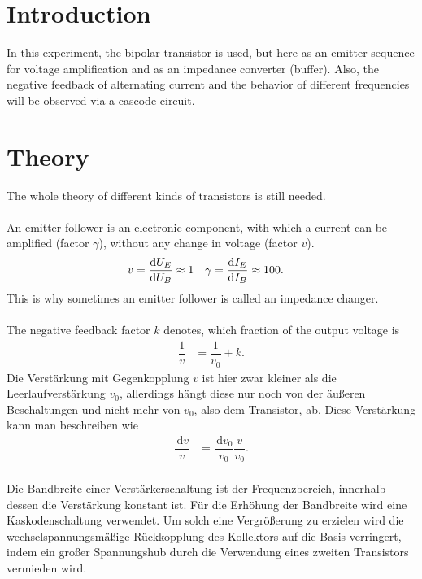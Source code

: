 \documentclass[a4paper,10pt]{article}
\newcommand{\td}{\,\text{d}}
\numberwithin{equation}{section}
\begin{document}
\begin{multicols}{2}
        \sloppy
        \section{Introduction}
        In this experiment, the bipolar transistor is used, but here as an emitter sequence for voltage amplification and as an impedance converter (buffer).
        Also, the negative feedback of alternating current and the behavior of different frequencies will be observed via a cascode circuit.

        \section{Theory}
        The whole theory of different kinds of transistors is still needed.
        \\\\An emitter follower is an electronic component, with which a current can be amplified (factor $\gamma $), without any change in voltage (factor $v$).
        \begin{align} 
                v &= \diff[]{U_E}{U_B}\approx 1 & \gamma &= \diff[]{I_E}{I_B}\approx 100
        .\end{align} 
        This is why sometimes an emitter follower is called an impedance changer.
        \\\\ The negative feedback factor $k$ denotes, which fraction of the output voltage is 
        \begin{align} 
                \dfrac{1}{v} &= \dfrac{1}{v_0}+k
        .\end{align} 
        Die Verstärkung mit Gegenkopplung $v$ ist hier zwar kleiner als die Leerlaufverstärkung $v_0$, allerdings hängt diese nur noch von der äußeren Beschaltungen und nicht mehr von $v_0$, also dem Transistor, ab.
        Diese Verstärkung kann man beschreiben wie
        \begin{align} 
                \dfrac{\td v}{v} &= \dfrac{\td v_0}{v_0}\dfrac{v}{v_0}
        .\end{align} 
        \\Die Bandbreite einer Verstärkerschaltung ist der Frequenzbereich, innerhalb dessen die Verstärkung konstant ist.
        Für die Erhöhung der Bandbreite wird eine Kaskodenschaltung verwendet.
        Um solch eine Vergrößerung zu erzielen wird die wechselspannungsmäßige Rückkopplung des Kollektors auf die Basis verringert, indem ein großer Spannungshub durch die Verwendung eines zweiten Transistors vermieden wird.

\end{multicols}
\end{document}
